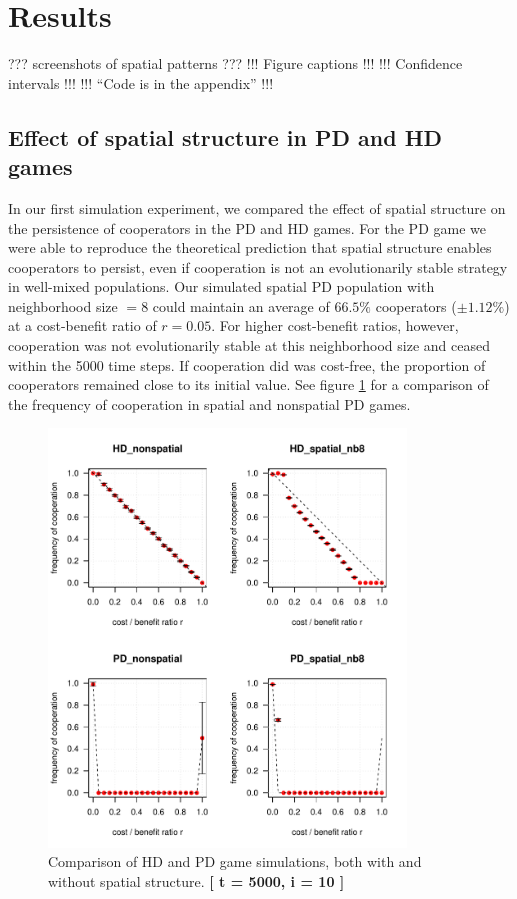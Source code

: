 
\section{Results}

??? screenshots of spatial patterns ???
!!! Figure captions !!!
!!! Confidence intervals !!!
!!! ``Code is in the appendix'' !!!

\subsection{Effect of spatial structure in PD and HD games}

In our first simulation experiment, we compared the effect of spatial structure on the persistence of cooperators in the PD and HD games. For the PD game we were able to reproduce the theoretical prediction that spatial structure enables cooperators to persist, even if cooperation is not an evolutionarily stable strategy in well-mixed populations. Our simulated spatial PD population with neighborhood size $= 8$ could maintain an average of $66.5\%$ cooperators ($\pm 1.12 \%$) at a cost-benefit ratio of $r = 0.05$. For higher cost-benefit ratios, however, cooperation was not evolutionarily stable at this neighborhood size and ceased within the 5000 time steps. If cooperation did was cost-free, the proportion of cooperators remained close to its initial value. See figure \ref{fig: task1_4plot} for a comparison of the frequency of cooperation in spatial and nonspatial PD games.




\begin{figure}[H]
	\centering 
	\includegraphics[width=9.5cm]{task1_4plot}
	\caption{Comparison of HD and PD game simulations, both with and without spatial structure.  \textbf{[ t = 5000, i = 10 ]} }\label{fig: task1_4plot}
\end{figure}

